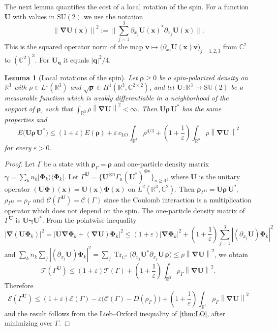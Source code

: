 \documentclass[final,reqno]{amsart}
\newtheorem{lemma}[theorem]{Lemma}
\theoremstyle{remark}
\renewcommand{\le}{\leqslant}
\renewcommand{\ge}{\geqslant}
\renewcommand{\epsilon}{\varepsilon}
\DeclareMathOperator{\Tr}{Tr}
\newcommand{\Trs}{\Tr_{\CC^2}}
\newcommand{\RR}{\mathbb{R}}
\newcommand{\CC}{\mathbb{C}}
\newcommand{\SU}{\mathrm{SU}}
\newcommand{\LO}{\mathrm{LO}}
\newcommand{\norm}[1]{\left\| #1 \right\|}
\newcommand{\grad}{\bm{\nabla}}
\newcommand{\TC}{\mathcal{T}}
\newcommand{\EC}{\mathcal{E}}
\newcommand{\Cc}{\mathcal{C}}
\begin{document}
The next lemma quantifies the cost of a local rotation of the spin. For a function $\mathbf{U}$ with values in $\SU(2)$ we use the notation
$$
\norm{\grad \mathbf{U}(\mathbf{x})}^2:=\bigg\|\sum_{j=1}^3\partial_{x_j}\mathbf{U}(\mathbf{x})^*\partial_{x_j}\mathbf{U}(\mathbf{x})\bigg\|.
$$
This is the squared operator norm of the map $\mathbf{v}\mapsto\big(\partial_{x_j}\mathbf{U}(\mathbf{x})\mathbf{v}\big)_{j=1,2,3}$ from $\CC^2$ to $(\CC^2)^3$. For $\mathbf{U}_{\mathbf{q}}$ it equals $|\mathbf{q}|^2/4$.

\begin{lemma}[Local rotations of the spin]\label{lem:gauge}
Let $\bm{\rho}\ge0$ be a spin-polarized density on $\RR^3$ with $\rho\in L^1(\RR^3)$ and $\sqrt{\bm{\rho}}\in H^1(\RR^3,\CC^{2\times2})$, and let $\mathbf{U}:\RR^3\to \SU(2)$ be a measurable function which is weakly differentiable in a neighborhood of the support of $\bm{\rho}$, such that $\int_{\RR^3}\rho\norm{\grad \mathbf{U}}^2<\infty$. Then $\mathbf{U}\bm{\rho}\,\mathbf{U}^*$ has the same properties and
\begin{equation*}
E\big(\mathbf{U}\bm{\rho}\,\mathbf{U}^*\big)\le (1+\epsilon)E(\bm{\rho})+\epsilon\, c_\LO\int_{\RR^3}\rho^{4/3}+\left(1+\frac1\epsilon\right)\int_{\RR^3}\rho\norm{\grad \mathbf{U}}^2
\end{equation*}
for every $\epsilon>0$.
\end{lemma}

\begin{proof}
Let $\Gamma$ be a state with $\bm{\rho}_\Gamma=\bm{\rho}$ and one-particle density matrix $\bm{\gamma}=\sum_kn_k|\bm{\Phi}_k\rangle\langle\bm{\Phi}_k|$. Let $\Gamma^{\mathbf{U}}=\{\mathbf{U}^{\otimes n}\Gamma_n(\mathbf{U}^*)^{\otimes n}\}_{n\ge0}$, where $\mathbf{U}$ is the unitary operator $(\mathbf{U}\bm{\Phi})(\mathbf{x})=\mathbf{U}(\mathbf{x})\bm{\Phi}(\mathbf{x})$ on $L^2(\RR^3,\CC^2)$. Then $\bm{\rho}_{\Gamma^{\mathbf{U}}}=\mathbf{U}\bm{\rho}\,\mathbf{U}^*$, $\rho_{\Gamma^{\mathbf{U}}}=\rho_\Gamma$ and $\Cc(\Gamma^{\mathbf{U}})=\Cc(\Gamma)$ since the Coulomb interaction is a multiplication operator which does not depend on the spin. The one-particle density matrix of $\Gamma^{\mathbf{U}}$ is $\mathbf{U}\bm{\gamma} \mathbf{U}^*$. From the pointwise inequality
$$
|\grad(\mathbf{U}\bm{\Phi}_k)|^2=|\mathbf{U}\grad\bm{\Phi}_k+(\grad \mathbf{U})\bm{\Phi}_k|^2\le(1+\epsilon)|\grad\bm{\Phi}_k|^2+\left(1+\frac1\epsilon\right)\sum_{j=1}^3|(\partial_{x_j}\mathbf{U})\bm{\Phi}_k|^2
$$
and $\sum_kn_k\sum_j|(\partial_{x_j}\mathbf{U})\bm{\Phi}_k|^2=\sum_j\Trs\big(\partial_{x_j}\mathbf{U}^*\partial_{x_j}\mathbf{U}\,\bm{\rho}\big)\le\rho\norm{\grad \mathbf{U}}^2$, we obtain
$$
\TC(\Gamma^{\mathbf{U}})\le(1+\epsilon)\TC(\Gamma)+\left(1+\frac1\epsilon\right)\int_{\RR^3}\rho_\Gamma\norm{\grad \mathbf{U}}^2.
$$
Therefore
$$
\EC(\Gamma^{\mathbf{U}})\le (1+\epsilon)\EC(\Gamma)-\epsilon\big(\Cc(\Gamma)-D(\rho_\Gamma)\big)+\left(1+\frac1\epsilon\right)\int_{\RR^3}\rho_\Gamma\norm{\grad \mathbf{U}}^2
$$
and the result follows from the Lieb--Oxford inequality of \cref{thm:LO}, after minimizing over $\Gamma$.
\end{proof}
\end{document}
